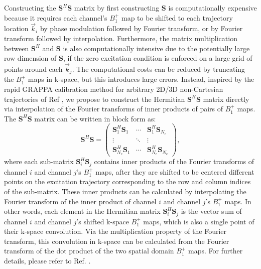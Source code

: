 \par Constructing the $\bm{S}^{H}\bm{S}$ matrix by first constructing $\bm{S}$ is computationally expensive 
because it requires each channel's $B_1^+$ map to be shifted to each trajectory location $\vec{k}_i$
by phase modulation followed by Fourier transform, or by Fourier transform followed by interpolation. 
Furthermore, 
the matrix multiplication between $\bm{S}^{H}$ and $\bm{S}$ is also computationally intensive due to the potentially 
large row dimension of $\bm{S}$, if the zero excitation condition is enforced on a large grid of points around each $\vec{k}_j$.
The computational costs can be reduced by truncating the $B_1^+$ maps in k-space, 
but this introduces large errors. 
Instead, inspired by the rapid GRAPPA calibration method for arbitrary 2D/3D non-Cartesian trajectories of Ref \cite{luo2019grappa}, 
we propose to construct the Hermitian $\bm{S}^{H}\bm{S}$ matrix directly via interpolation of the Fourier transforms
of inner products of pairs of $B_1^+$ maps. 
The $\bm{S}^H\bm{S}$ matrix can be written in block form as:
\begin{equation}\label{eq:SHS_blocks}
\bm{S}^{H}\bm{S} = 
\begin{pmatrix}
\bm{S}_1^{H}\bm{S}_1 & \cdots & \bm{S}_1^{H}\bm{S}_{N_c} \\
\vdots  &  \ddots & \vdots  \\
\bm{S}_{N_c}^{H}\bm{S}_1 & \cdots & \bm{S}_{N_c}^{H}\bm{S}_{N_c} 
\end{pmatrix}, 
\end{equation}
where each sub-matrix $\bm{S}_i^H\bm{S}_j$ contains inner products of the Fourier transforms of channel $i$ and channel $j$'s 
$B_1^+$ maps, after they are shifted to be centered different points on the excitation trajectory corresponding to the row 
and column indices of the sub-matrix.
These inner products can be calculated by interpolating the Fourier transform of the inner product of 
channel $i$ and channel $j$'s $B_1^+$ maps. 
In other words, each element in the Hermitian matrix $\bm{S}_i^{H}\bm{S}_j$ 
is the vector sum of channel $i$ and channel $j$'s shifted k-space $B_1^+$ maps, 
which is also a single point of their k-space convolution. 
Via the multiplication property of the Fourier transform, 
this convolution in k-space can be calculated from the Fourier transform of the dot product of the two spatial domain $B_1^+$ maps. 
For further details, please refer to Ref. \cite{luo2019grappa}.

